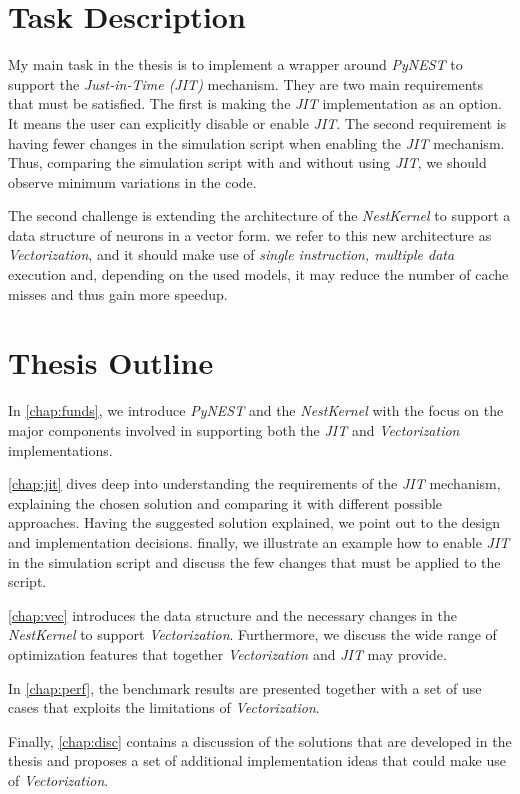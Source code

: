 \section{Task Description}
My main task in the thesis is to implement a wrapper around \emph{PyNEST} to support the \emph{Just-in-Time (JIT)} mechanism. They are two main requirements that must be satisfied. The first is making the \emph{JIT} implementation as an option. It means the user can explicitly disable or enable \emph{JIT}. The second requirement is having fewer changes in the simulation script when enabling the \emph{JIT} mechanism. Thus, comparing the simulation script with and without using \emph{JIT}, we should observe minimum variations in the code.

The second challenge is extending the architecture of the \emph{NestKernel} to support a data structure of neurons in a vector form. we refer to this new architecture as \emph{Vectorization}, and it should make use of \emph{single instruction, multiple data} execution and, depending on the used models, it may reduce the number of cache misses and thus gain more speedup.
\section{Thesis Outline}


In \autoref{chap:funds}, we introduce \emph{PyNEST} and the \emph{NestKernel} with the focus on the major components involved in supporting both the \emph{JIT} and \emph{Vectorization} implementations.

\autoref{chap:jit} dives deep into understanding the requirements of the \emph{JIT} mechanism, explaining the chosen solution and comparing it with different possible approaches. Having the suggested solution explained, we point out to the design and implementation decisions. finally, we illustrate an example how to enable \emph{JIT} in the simulation script and discuss the few changes that must be applied to the script.

\autoref{chap:vec} introduces the data structure and the necessary changes in the \emph{NestKernel} to support \emph{Vectorization}. Furthermore, we discuss the wide range of optimization features that together \emph{Vectorization} and \emph{JIT} may provide.

In \autoref{chap:perf}, the benchmark results are presented together with a set of use cases that exploits the limitations of \emph{Vectorization}.

Finally, \autoref{chap:disc} contains a discussion of the solutions that are developed in the thesis and proposes a set of additional implementation ideas that could make use of \emph{Vectorization}.



\cleardoublepage